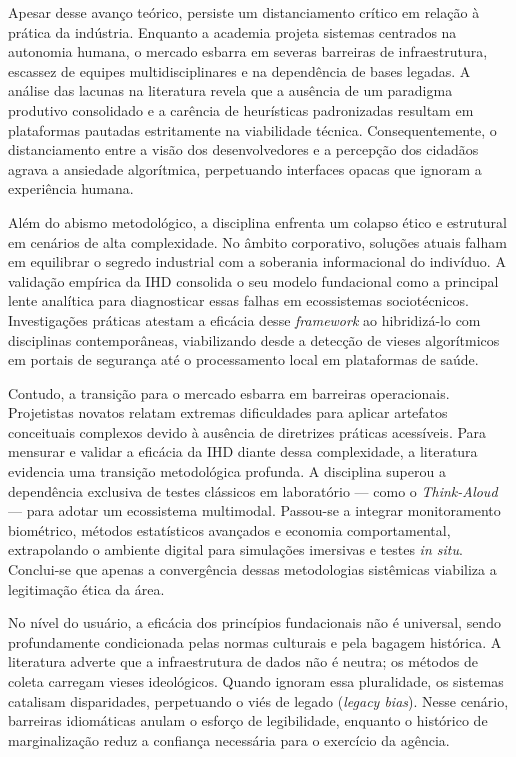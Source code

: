 \documentclass[
	12pt,				%
	oneside,			%
	a4paper,			%
	english,			%
	brazil				%
	]{abntex2ppgsi}
\begin{document}
    Apesar desse avanço teórico, persiste um distanciamento crítico em relação à prática da indústria. Enquanto a academia projeta sistemas centrados na autonomia humana, o mercado esbarra em severas barreiras de infraestrutura, escassez de equipes multidisciplinares e na dependência de bases legadas. A análise das lacunas na literatura revela que a ausência de um paradigma produtivo consolidado e a carência de heurísticas padronizadas resultam em plataformas pautadas estritamente na viabilidade técnica. Consequentemente, o distanciamento entre a visão dos desenvolvedores e a percepção dos cidadãos agrava a ansiedade algorítmica, perpetuando interfaces opacas que ignoram a experiência humana.

    Além do abismo metodológico, a disciplina enfrenta um colapso ético e estrutural em cenários de alta complexidade. No âmbito corporativo, soluções atuais falham em equilibrar o segredo industrial com a soberania informacional do indivíduo. A validação empírica da IHD consolida o seu modelo fundacional como a principal lente analítica para diagnosticar essas falhas em ecossistemas sociotécnicos. Investigações práticas atestam a eficácia desse \textit{framework} ao hibridizá-lo com disciplinas contemporâneas, viabilizando desde a detecção de vieses algorítmicos em portais de segurança até o processamento local em plataformas de saúde. 
    
    Contudo, a transição para o mercado esbarra em barreiras operacionais. Projetistas novatos relatam extremas dificuldades para aplicar artefatos conceituais complexos devido à ausência de diretrizes práticas acessíveis. Para mensurar e validar a eficácia da IHD diante dessa complexidade, a literatura evidencia uma transição metodológica profunda. A disciplina superou a dependência exclusiva de testes clássicos em laboratório — como o \textit{Think-Aloud} — para adotar um ecossistema multimodal. Passou-se a integrar monitoramento biométrico, métodos estatísticos avançados e economia comportamental, extrapolando o ambiente digital para simulações imersivas e testes \textit{in situ}. Conclui-se que apenas a convergência dessas metodologias sistêmicas viabiliza a legitimação ética da área.

    No nível do usuário, a eficácia dos princípios fundacionais não é universal, sendo profundamente condicionada pelas normas culturais e pela bagagem histórica. A literatura adverte que a infraestrutura de dados não é neutra; os métodos de coleta carregam vieses ideológicos. Quando ignoram essa pluralidade, os sistemas catalisam disparidades, perpetuando o viés de legado (\textit{legacy bias}). Nesse cenário, barreiras idiomáticas anulam o esforço de legibilidade, enquanto o histórico de marginalização reduz a confiança necessária para o exercício da agência. 
    
\end{document}
